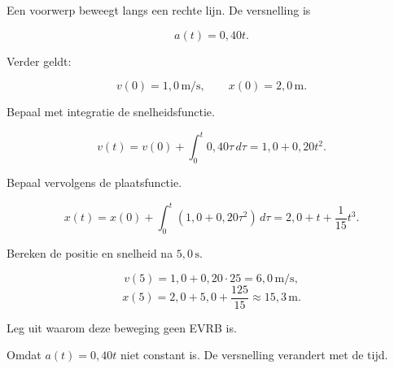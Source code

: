 \documentclass{ximera}
\begin{document}
\begin{oefening}{\oefG}

Een voorwerp beweegt langs een rechte lijn. De versnelling is

\[a(t)=0,40t.\]

Verder geldt:

\[v(0)=1,0\,\mathrm{m/s}, \qquad x(0)=2,0\,\mathrm{m}.\]

\begin{question}

Bepaal met integratie de snelheidsfunctie.

\begin{oplossing}
\[v(t)=v(0)+\int_0^t0,40\tau\,d\tau =1,0+0,20t^2.\]
\end{oplossing}

\end{question}

\begin{question}

Bepaal vervolgens de plaatsfunctie.

\begin{oplossing}
\[x(t)=x(0)+\int_0^t(1,0+0,20\tau^2)\,d\tau =2,0+t+\frac1{15}t^3.\]
\end{oplossing}

\end{question}

\begin{question}

Bereken de positie en snelheid na $5,0\,\mathrm{s}$.

\begin{oplossing}
\[v(5)=1,0+0,20\cdot25=6,0\,\mathrm{m/s},\]
\[x(5)=2,0+5,0+\frac{125}{15}\approx15,3\,\mathrm{m}.\]
\end{oplossing}

\end{question}

\begin{question}

Leg uit waarom deze beweging geen EVRB is.

\begin{oplossing}
Omdat \(a(t)=0,40t\) niet constant is. De versnelling verandert met de tijd.
\end{oplossing}

\end{question}

\end{oefening}
\end{document}
